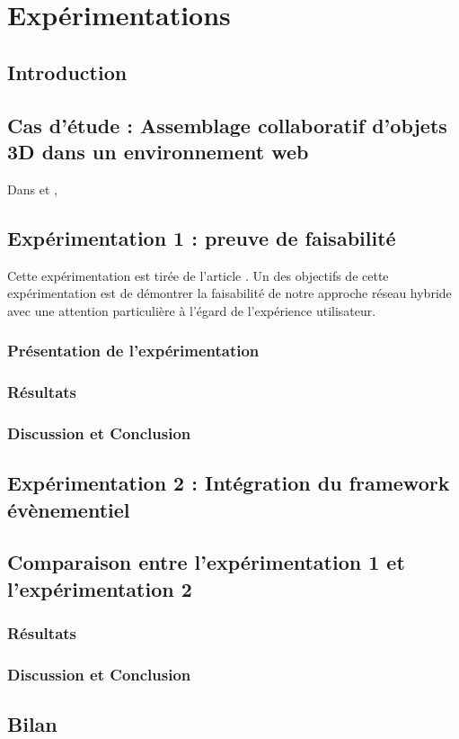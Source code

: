 \chapter{Expérimentations}
\chaptertable

\section{Introduction}
\section{Cas d'étude : Assemblage collaboratif d'objets 3D dans un 
environnement web}
Dans \cite{Desprat2015a} et \cite{Desprat2017}, 


\section{Expérimentation 1 : preuve de faisabilité}
Cette expérimentation est tirée de l'article \cite{Desprat2015a}.
Un des objectifs de cette expérimentation est de démontrer la faisabilité de notre 
approche réseau hybride avec une attention particulière à l'égard de l'expérience 
utilisateur.
\subsection{Présentation de l'expérimentation}

\subsection{Résultats}
\subsection{Discussion et Conclusion}

\section{Expérimentation 2 : Intégration du framework évènementiel}
\label{sec:us}






\section{Comparaison entre l'expérimentation 1 et l'expérimentation 2}
\subsection{Résultats}
\subsection{Discussion et Conclusion}
\section{Bilan}
